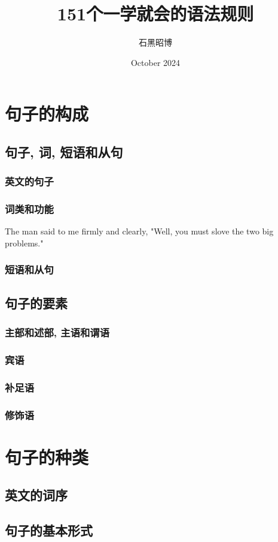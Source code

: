 \documentclass{article}
\title{151个一学就会的语法规则}
\author{石黑昭博}
\date{October 2024}
\begin{document}
\tableofcontents

\maketitle

\section{句子的构成}
\subsection{句子, 词, 短语和从句}
\subsubsection{英文的句子}
\subsubsection{词类和功能}
    The man said to me firmly and clearly, "Well, you must slove the two big problems."
\subsubsection{短语和从句}
\subsection{句子的要素}
\subsubsection{主部和述部, 主语和谓语}
\subsubsection{宾语}
\subsubsection{补足语}
\subsubsection{修饰语}
\section{句子的种类}
\subsection{英文的词序}
\subsection{句子的基本形式}
\end{document}
